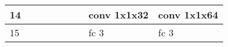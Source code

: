 \documentclass[10pt,a4paper]{article}
\begin{document}
\begin{table}[]
\begin{tabular}{|l|l|l|l|l|l|l|l|l|}
14             &                                &                                                                                &                                                                                     &                                                                                     &                                                                                     &                                                                                     & \cellcolor[HTML]{96FFFB}conv 1x1x32                                                 & \cellcolor[HTML]{96FFFB}conv 1x1x64                                                 \\ \hline
15             &                                &                                                                                &                                                                                     &                                                                                     &                                                                                     &                                                                                     & \cellcolor[HTML]{9AFF99}fc 3                                                        & \cellcolor[HTML]{9AFF99}fc 3                                                        \\ \hline
\end{tabular}
\end{table}
\end{document}
